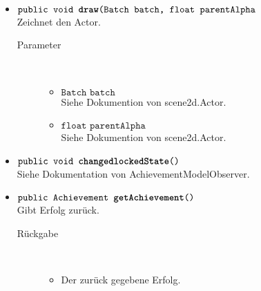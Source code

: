 \begin{description}
\begin{itemize}
			\item $\texttt{public void \textbf{draw}(Batch batch, float parentAlpha}$ \\ Zeichnet den Actor.
			\begin{description}
				\item[Parameter] \hfill \\
				\vspace{-.8cm}
				\begin{itemize}
					\item $\texttt{Batch batch}$ \\ Siehe Dokumention von scene2d.Actor.
					\item $\texttt{float parentAlpha}$ \\ Siehe Dokumention von scene2d.Actor.
				\end{itemize}
			\end{description}	
			
		\item $\texttt{public void \textbf{changedlockedState}()}$ \\ Siehe Dokumentation von AchievementModelObserver.
	
		\item $\texttt{public Achievement \textbf{getAchievement}()}$ \\ Gibt Erfolg zurück.
		\begin{description}
			\item[Rückgabe] \hfill \\
			\vspace{-.8cm}
			\begin{itemize}
				\item Der zurück gegebene Erfolg.
			\end{itemize}
		\end{description}	
	
	\end{itemize}
\end{description}
